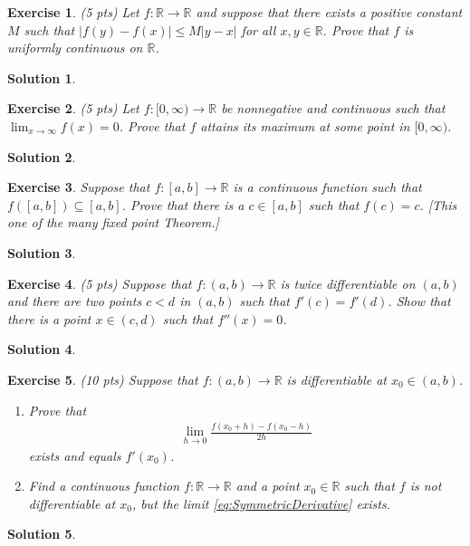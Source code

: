 \documentclass[12pt]{article}
\newcommand{\bR}{\mathbb{R}}
\newcommand{\ra}{\rightarrow}
\theoremstyle{plain}
\newtheorem{exer}{\textbf{Exercise}}}
\theoremstyle{plain}
\newtheorem*{sol}{\textbf{Solution}}}
\begin{document}
\begin{exer}
(5 pts)
Let $f : \bR \ra \bR$ and suppose that there exists a positive constant $M$ such that $|f(y) - f(x)| \leq M |y - x|$ for all $x, y \in \bR$. Prove that $f$ is uniformly continuous on $\bR$.
\end{exer}
\begin{sol}

\end{sol}

\begin{exer}
(5 pts)
Let $f : [0, \infty ) \ra \bR$ be nonnegative and continuous such that $\lim_{x \ra \infty} f(x) = 0$. Prove that $f$ attains its maximum at some point in $[0, \infty )$.
\end{exer}
\begin{sol}

\end{sol}

\begin{exer}
Suppose that $f: [a, b] \ra \bR$ is a continuous function such that $f([a, b]) \subseteq [a, b]$. Prove that there is a $c \in [a, b]$ such that $f(c) = c$. [This one of the many fixed point Theorem.]
\end{exer}
\begin{sol}

\end{sol}

\begin{exer}
(5 pts)
Suppose that $f: (a, b) \ra \bR$ is twice differentiable on $(a,b)$ and there are two points $c  < d$ in $(a ,b)$ such that $f'(c) = f'(d)$. Show that there is a point $x \in (c, d)$ such that $f''(x) = 0$.
\end{exer}
\begin{sol}

\end{sol}

\begin{exer}
(10 pts)
Suppose that $f : (a, b) \ra \bR$ is differentiable at $x_0 \in (a, b)$. 
	\begin{enumerate}[label=\textbf{\alph*)}]
	\item Prove that
	\begin{align}
	\lim_{h \ra 0} \frac{f (x_0 + h) - f(x_0 - h)}{2h} \label{eq:SymmetricDerivative}\tag{$\star$}
	\end{align}
exists and equals $f'(x_0)$.
	\item Find a continuous function $f : \bR \ra \bR$ and a point $x_0 \in \bR$ such that $f$ is not differentiable at $x_0$, but the limit \eqref{eq:SymmetricDerivative} exists.
	\end{enumerate}
\end{exer}
\begin{sol}

\end{sol}
\end{document}
